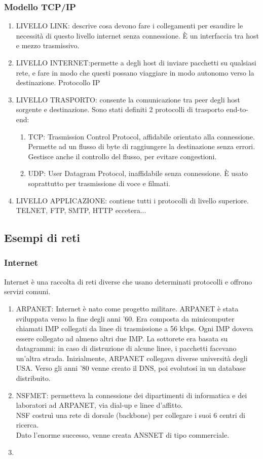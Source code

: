 \documentclass{article}
\begin{document}
			\subsubsection{Modello TCP/IP}
				\begin{enumerate}
					\item LIVELLO LINK: descrive cosa devono fare i collegamenti per esaudire le necessità di questo livello internet senza connessione. È un interfaccia tra host e mezzo trasmissivo.
					\item LIVELLO INTERNET:permette a degli host di inviare pacchetti su qualsiasi rete, e fare in modo che questi possano viaggiare in modo autonomo verso la destinazione. Protocollo IP
					\item LIVELLO TRASPORTO: consente la comunicazione tra peer degli host sorgente e destinazione. Sono stati definiti 2 protocolli di trasporto end-to-end:
					\begin{enumerate}
						\item TCP: Trasmission Control Protocol, affidabile orientato alla connessione. Permette ad un flusso di byte di raggiungere la destinazione senza errori. Gestisce anche il controllo del flusso, per evitare congestioni. 
						\item UDP: User Datagram Protocol, inaffidabile senza connessione. È usato soprattutto per trasmissione di voce e filmati. 
					\end{enumerate}
					\item LIVELLO APPLICAZIONE: contiene tutti i protocolli di livello superiore. TELNET, FTP, SMTP, HTTP eccetera...
				\end{enumerate}
		\subsection{Esempi di reti}
			\subsubsection{Internet}
			Internet è una raccolta di reti diverse che usano determinati protocolli e offrono servizi comuni. 
			\begin{enumerate}
				\item ARPANET: Internet è nato come progetto militare. ARPANET è stata sviluppata verso la fine degli anni '60. Era composta da minicomputer chiamati IMP collegati da linee di trasmissione a 56 kbps. Ogni IMP doveva essere collegato ad almeno altri due IMP. La sottorete era basata su datagrammi: in caso di distruzione di alcune linee, i pacchetti facevano un'altra strada. Inizialmente, ARPANET collegava diverse università degli USA. Verso gli anni '80 venne creato il DNS, poi evolutosi in un database distribuito. 
				\item NSFMET: permetteva la connessione dei dipartimenti di informatica e dei laboratori ad ARPANET, via dial-up e linee d'affitto. \\
				NSF costruì una rete di dorsale (backbone) per collegare i suoi 6 centri di ricerca.\\ Dato l'enorme successo, venne creata ANSNET di tipo commerciale. 
				\item 
			\end{enumerate}
\end{document}
